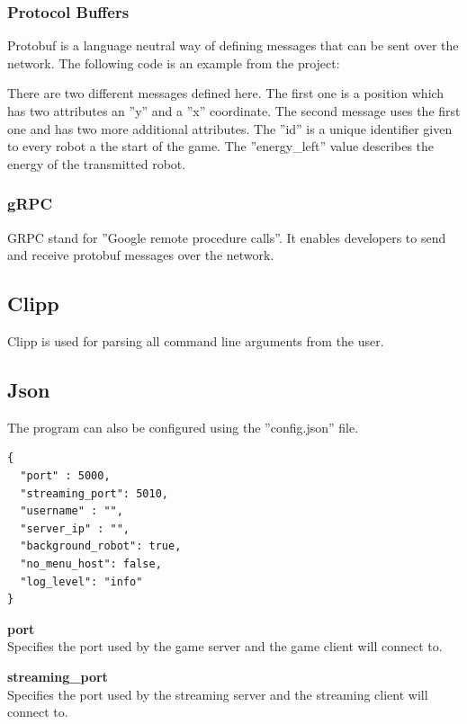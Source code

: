 \documentclass[12pt]{report}
\begin{document}
\subsubsection{Protocol Buffers}

Protobuf is a language neutral way of defining messages that can be sent over the network. The following code is an example from the project:



There are two different messages defined here. The first one is a position which has two attributes an ''y'' and a ''x'' coordinate. The second message uses the first one and has two more additional attributes. The ''id'' is a unique identifier given to every robot a the start of the game. The ''energy\_left'' value describes the energy of the transmitted robot.

\subsubsection{gRPC}

GRPC stand for ''Google remote procedure calls''. It enables developers to send and receive protobuf messages over the network.

\subsection{Clipp}

Clipp is used for parsing all command line arguments from the user.

\subsection{Json}

The program can also be configured using the ''config.json'' file.

\begin{lstlisting}[frame=single]
{
  "port" : 5000,
  "streaming_port": 5010,
  "username" : "",
  "server_ip" : "",
  "background_robot": true,
  "no_menu_host": false,
  "log_level": "info"
}
\end{lstlisting}

\textbf{port} \\
Specifies the port used by the game server and the game client will connect to.

\textbf{streaming\_port} \\
Specifies the port used by the streaming server and the streaming client will connect to.
\end{document}
